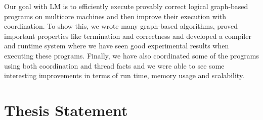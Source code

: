 \iffalse
Since coordination facts are semantically equivalent to
computation and a first class entity of LM, it is still possible to reason about
programs even in the presence of coordination.
\fi

Our goal with LM is to efficiently execute provably correct logical graph-based
programs on multicore machines and then improve their execution with
coordination. To show this, we wrote many graph-based algorithms, proved
important properties like termination and correctness and developed a compiler
and runtime system where we have seen good experimental results when executing
these programs. Finally, we have also coordinated some of the programs using
both coordination and thread facts and we were able to see some interesting
improvements in terms of run time, memory usage and scalability.

\section{Thesis Statement}



